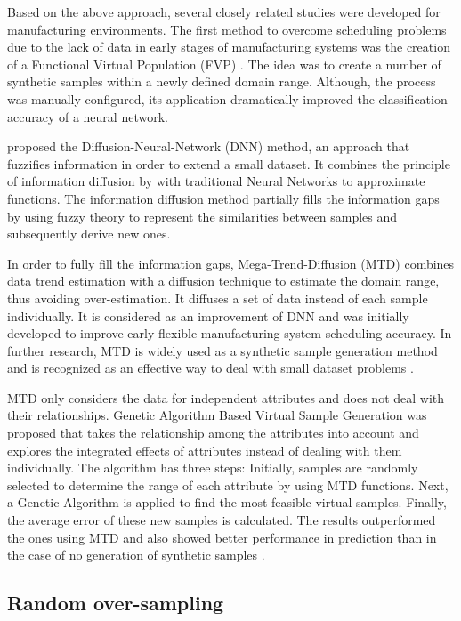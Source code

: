 \documentclass[parskip=full]{scrartcl}
\begin{document}
Based on the above approach, several closely related studies were developed for
manufacturing environments. The first method to overcome scheduling problems due
to the lack of data in early stages of manufacturing systems was the creation of
a Functional Virtual Population (FVP) \cite{Li.2003}. The idea was to create a
number of synthetic samples within a newly defined domain range. Although, the
process was manually configured, its application dramatically improved the
classification accuracy of a neural network. 

\cite{Huang.2004} proposed the Diffusion-Neural-Network (DNN) method, an
approach that fuzzifies information in order to extend a small dataset. It
combines the principle of information diffusion by \cite{Huang.1997} with
traditional Neural Networks to approximate functions. The information diffusion
method partially fills the information gaps by using fuzzy theory to represent
the similarities between samples and subsequently derive new ones.

In order to fully fill the information gaps, Mega-Trend-Diffusion (MTD)
\cite{Li.2007} combines data trend estimation with a diffusion technique to
estimate the domain range, thus avoiding over-estimation. It diffuses a set of
data instead of each sample individually. It is considered as an improvement of
DNN and was initially developed to improve early flexible manufacturing system
scheduling accuracy. In further research, MTD is widely used as a synthetic
sample generation method and is recognized as an effective way to deal with
small dataset problems \cite{AbdulLateh.2017}.

MTD only considers the data for independent attributes and does not deal with
their relationships. Genetic Algorithm Based Virtual Sample Generation was
proposed that takes the relationship among the attributes into account and
explores the integrated effects of attributes instead of dealing with them
individually. The algorithm has three steps: Initially, samples are randomly
selected to determine the range of each attribute by using MTD functions. Next,
a Genetic Algorithm is applied to find the most feasible virtual samples.
Finally, the average error of these new samples is calculated. The results
outperformed the ones using MTD and also showed better performance in prediction
than in the case of no generation of synthetic samples \cite{Li.2014, Lin.2010}.

\subsection{Random over-sampling}
\end{document}
